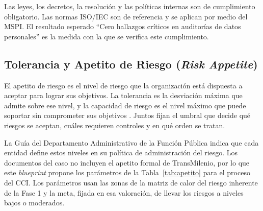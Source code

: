 Las leyes, los decretos, la resolución y las políticas internas son de cumplimiento obligatorio. Las normas ISO/IEC son de referencia y se aplican por medio del MSPI. El resultado esperado ``Cero hallazgos críticos en auditorías de datos personales'' es la medida con la que se verifica este cumplimiento.

\subsection{Tolerancia y Apetito de Riesgo (\textit{Risk Appetite})}

El apetito de riesgo es el nivel de riesgo que la organización está dispuesta a aceptar para lograr sus objetivos. La tolerancia es la desviación máxima que admite sobre ese nivel, y la capacidad de riesgo es el nivel máximo que puede soportar sin comprometer sus objetivos \parencite{funcionpublica2025}. Juntos fijan el umbral que decide qué riesgos se aceptan, cuáles requieren controles y en qué orden se tratan.

La Guía del Departamento Administrativo de la Función Pública \parencite{funcionpublica2025} indica que cada entidad define estos niveles en su política de administración del riesgo. Los documentos del caso no incluyen el apetito formal de TransMilenio, por lo que este \textit{blueprint} propone los parámetros de la Tabla~\ref{tab:apetito} para el proceso del CCI. Los parámetros usan las zonas de la matriz de calor del riesgo inherente de la Fase 1 \parencite{fase1cci2026} y la meta, fijada en esa valoración, de llevar los riesgos a niveles bajos o moderados.

